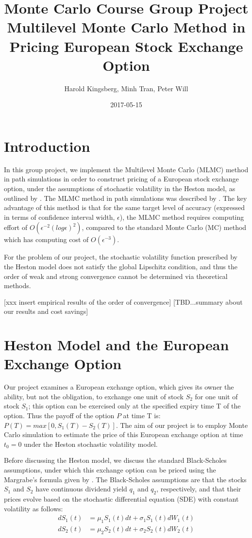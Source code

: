 \documentclass{article}
\title{Monte Carlo Course Group Project \\ 
Multilevel Monte Carlo Method in Pricing European Stock Exchange Option}
\author{Harold Kingsberg, Minh Tran, Peter Will}
\date{2017-05-15}
\begin{document}
\maketitle
\tableofcontents

\newpage
\section{Introduction} 
	In this group project, we implement the Multilevel Monte Carlo (MLMC) method in path simulations in order to construct pricing of a European stock exchange option, under the assumptions of stochastic volatility in the Heston model, as outlined by \cite{heston93}. The MLMC method in path simulations was described by \cite{giles08}. The key advantage of this method is that for the same target level of accuracy (expressed in terms of confidence interval width, $\epsilon$), the MLMC method requires computing effort of $O(\epsilon^{-2}(log\epsilon)^2)$, compared to the standard Monte Carlo (MC) method which has computing cost of $O(\epsilon^{-3})$. 
    
    For the problem of our project, the stochastic volatility function prescribed by the Heston model does not satisfy the global Lipschitz condition, and thus the order of weak and strong convergence cannot be determined \cite{giles08} via theoretical methods.
	
	[xxx insert empirical results of the order of convergence]
	[TBD...summary about our results and cost savings]

\section{Heston Model and the European Exchange Option}
	Our project examines a European exchange option, which gives its owner the ability, but not the obligation, to exchange one unit of stock $S_2$ for one unit of stock $S_1$; this option can be exercised only at the specified expiry time T of the option. Thus the payoff of the option $P$ at time T is: $P(T)=max[0, S_1(T)-S_2(T)]$. The aim of our project is to employ Monte Carlo simulation to estimate the price of this European exchange option at time $t_0=0$ under the Heston stochastic volatility model.
    
    Before discussing the Heston model, we discuss the standard Black-Scholes assumptions, under which this exchange option can be priced using the Margrabe's formula given by \cite{margrabe78}. The Black-Scholes assumptions are that the stocks $S_1$ and $S_2$ have continuous dividend yield $q_1$ and $q_2$, respectively, and that their prices evolve based on the stochastic differential equation (SDE) with constant volatility as follows:
	\begin{align*}
	dS_1(t) &= \mu_1 S_1(t) dt + \sigma_1 S_1(t) dW_1(t) \\
	dS_2(t) &= \mu_2 S_2(t) dt + \sigma_2 S_2(t) dW_2(t)
	\end{align*}	
	
\end{document}
